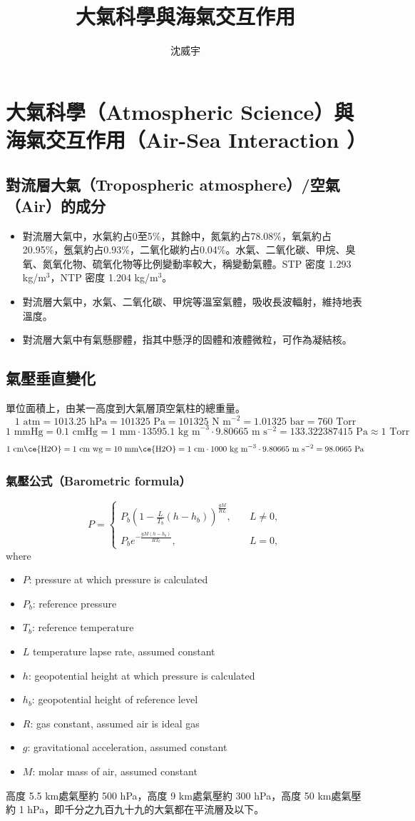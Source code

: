 \documentclass[a4paper,12pt]{report}
\begin{document}
\title{大氣科學與海氣交互作用}
\author{沈威宇}
\date{\temtoday}
\titletocdoc
\chapter{大氣科學（Atmospheric Science）與海氣交互作用（Air-Sea Interaction ）}
\section{對流層大氣（Tropospheric atmosphere）/空氣（Air）的成分}
\begin{itemize}
\item 對流層大氣中，水氣約占0至5\%，其餘中，氮氣約占78.08\%，氧氣約占20.95\%，氬氣約占0.93\%，二氧化碳約占0.04\%。水氣、二氧化碳、甲烷、臭氧、氮氧化物、硫氧化物等比例變動率較大，稱變動氣體。STP 密度 1.293 kg/m$^3$，NTP 密度 1.204 kg/m$^3$。
\item 對流層大氣中，水氣、二氧化碳、甲烷等溫室氣體，吸收長波輻射，維持地表溫度。
\item 對流層大氣中有氣懸膠體，指其中懸浮的固體和液體微粒，可作為凝結核。
\end{itemize}
\section{氣壓垂直變化}
單位面積上，由某一高度到大氣層頂空氣柱的總重量。
\[1\text{\ atm}=1013.25\text{\ hPa}=101325\text{\ Pa}=101325\text{\ N m}^{-2}=1.01325\text{\ bar}=760\text{\ Torr}\]
\[1\text{\ mmHg}=0.1\text{\ cmHg}=1\text{\ mm}\cdot 13595.1\text{\ kg m}^{-3}\cdot 9.80665\text{\ m s}^{-2}=133.322387415\text{\ Pa}\approx 1\text{\ Torr}\]
\[1\text{\ cm\ce{H2O}}=1\text{\ cm wg}=10\text{\ mm\ce{H2O}}=1\text{\ cm}\cdot 1000\text{\ kg m}^{-3}\cdot 9.80665\text{\ m s}^{-2}=98.0665\text{\ Pa}\]
\subsection{氣壓公式（Barometric formula）}
\[P=\begin{cases}
P_b\left(1-\frac{L}{T_b}(h-h_b)\right)^{\frac{gM}{RL}},\quad & L\neq 0,\\
P_be^{-\frac{gM(h-h_b)}{RT_b}},\quad & L=0,
\end{cases}\]
where
\begin{itemize}
\item $P$: pressure at which pressure is calculated
\item $P_b$: reference pressure
\item $T_b$: reference temperature
\item $L$ temperature lapse rate, assumed constant
\item $h$: geopotential height at which pressure is calculated
\item $h_b$: geopotential height of reference level
\item $R$: gas constant, assumed air is ideal gas
\item $g$: gravitational acceleration, assumed constant 
\item $M$: molar mass of air, assumed constant 
\end{itemize}
高度 5.5 km處氣壓約 500 hPa，高度 9 km處氣壓約 300 hPa，高度 50 km處氣壓約 1 hPa，即千分之九百九十九的大氣都在平流層及以下。
\end{document}
